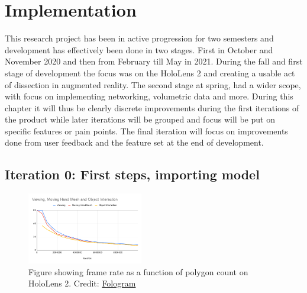 


\chapter{Implementation}\label{chap:implementaiton}




This research project has been in active progression for two semesters and development has effectively been done in two stages. First in October and November 2020 and then from February till May in 2021. During the fall and first stage of development the focus was on the HoloLens 2 and creating a usable act of dissection in augmented reality. The second stage at spring, had a wider scope, with focus on implementing networking, volumetric data and more. During this chapter it will thus be clearly discrete improvements during the first iterations of the product while later iterations will be grouped and focus will be put on specific features or pain points. The final iteration will focus on improvements done from user feedback and the feature set at the end of development.


\section[Iteration 0]{Iteration 0: First steps, importing model}\label{chap:zeroiter}

\begin{figure} 
    \centering
    \includegraphics[width=0.45\textwidth]{fig/hololens2polycount}
    \caption{Figure showing frame rate as a function of polygon count on HoloLens 2. Credit: \href{https://community.fologram.com/t/hololens-2-polygon-count-and-frame-rate/49}{Fologram}}
    \label{fig:polycount}
\end{figure}

